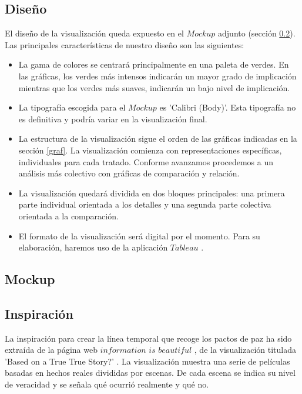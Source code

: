 \documentclass[11pt]{article}
\begin{document}
\subsection{Diseño}\label{diseno}

El diseño de la visualización queda expuesto en el $\textit{Mockup}$ adjunto (sección \ref{mo}). Las principales características de nuestro diseño son las siguientes:
\begin{itemize}
    \item La gama de colores se centrará principalmente en una paleta de verdes. En las gráficas, los verdes más intensos indicarán un mayor grado de implicación mientras que los verdes más suaves, indicarán un bajo nivel de implicación.
    
    \item La tipografía escogida para el $\textit{Mockup}$ es 'Calibri (Body)'. Esta tipografía no es definitiva y podría variar en la visualización final.
    
    \item La estructura de la visualización sigue el orden de las gráficas indicadas en la sección \ref{graf}. La visualización comienza con representaciones específicas, individuales para cada tratado. Conforme avanzamos procedemos a un análisis más colectivo con gráficas de comparación y relación.
    
    \item La visualización quedará dividida en dos bloques principales: una primera parte individual orientada a los detalles y una segunda parte colectiva orientada a la comparación.
    
    \item El formato de la visualización será digital por el momento. Para su elaboración, haremos uso de la aplicación $\textit{Tableau}$ \cite{tableau}.
\end{itemize}
 
\subsection{Mockup}\label{mo}

\pagebreak

\subsection{Inspiración}\label{inspi}

La inspiración para crear la línea temporal que recoge los pactos de paz ha sido extraída de la página web  $\textit{information is beautiful}$ \cite{beau}, de la visualización titulada 'Based on a True True Story?' \cite{true}. La visualización muestra una serie de películas basadas en hechos reales divididas por escenas. De cada escena se indica su nivel de veracidad y se señala qué ocurrió realmente y qué no.
\end{document}
